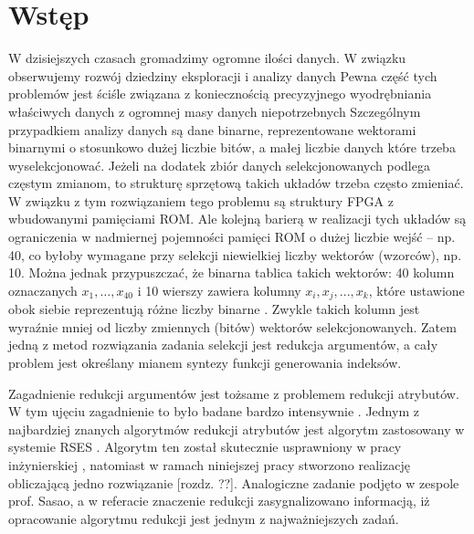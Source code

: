 \chapter{Wstęp}

W dzisiejszych czasach gromadzimy ogromne ilości danych.
W związku obserwujemy rozwój dziedziny eksploracji i analizy danych
Pewna część tych problemów jest ściśle związana z koniecznością precyzyjnego wyodrębniania właściwych danych z ogromnej masy danych niepotrzebnych
Szczególnym przypadkiem analizy danych są dane binarne, reprezentowane wektorami binarnymi o stosunkowo dużej liczbie bitów,
a małej liczbie danych które trzeba wyselekcjonować.
Jeżeli na dodatek zbiór danych selekcjonowanych podlega częstym zmianom,
to strukturę sprzętową takich układów trzeba często zmieniać.
W związku z tym rozwiązaniem tego problemu są struktury FPGA z wbudowanymi pamięciami ROM.
Ale kolejną barierą w realizacji tych układów są ograniczenia w nadmiernej pojemności pamięci ROM o dużej liczbie wejść – np. 40,
co byłoby wymagane przy selekcji niewielkiej liczby wektorów (wzorców), np. 10.
Można jednak przypuszczać, że binarna tablica takich wektorów: 40 kolumn oznaczanych $x_1,…,x_{40}$ i 10 wierszy zawiera kolumny $x_i, x_j, ..., x_k$,
które ustawione obok siebie reprezentują różne liczby binarne \cite{sasao-workshop}.
Zwykle takich kolumn jest wyraźnie mniej od liczby zmiennych (bitów) wektorów selekcjonowanych.
Zatem jedną z metod rozwiązania zadania selekcji jest redukcja argumentów,
a cały problem jest określany mianem syntezy funkcji generowania indeksów.

Zagadnienie redukcji argumentów jest tożsame z problemem redukcji atrybutów.
W tym ujęciu zagadnienie to było badane bardzo intensywnie \cite{fast-algorithm, efektywna-procedura, new-reduction, steinbach-posthoff, skowron-rauszer, slezak, novel-method}.
Jednym z najbardziej znanych algorytmów redukcji atrybutów jest algorytm zastosowany w systemie RSES \cite{rses}.
Algorytm ten został skutecznie usprawniony w pracy inżynierskiej \cite{efektywna-procedura},
natomiast w ramach niniejszej pracy stworzono realizację obliczającą jedno rozwiązanie [rozdz. ??].
Analogiczne zadanie podjęto w zespole prof. Sasao,
a w referacie \cite{sasao-workshop} znaczenie redukcji zasygnalizowano informacją,
iż opracowanie algorytmu redukcji jest jednym z najważniejszych zadań.

